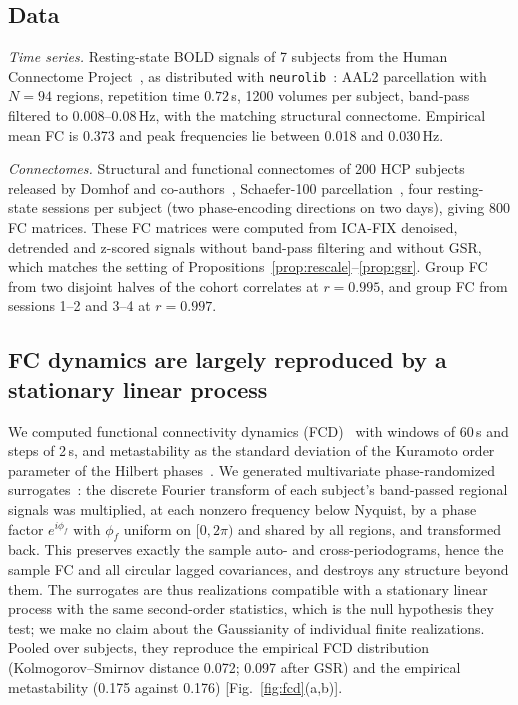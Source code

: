\documentclass[aip,cha,reprint,amsmath,amssymb]{revtex4-2}
\theoremstyle{remark}
\begin{document}
\subsection{Data}

\emph{Time series.} Resting-state BOLD signals of 7 subjects from the Human Connectome Project~\cite{VanEssen2013}, as distributed with \texttt{neurolib}~\cite{Cakan2023}: AAL2 parcellation with $N=94$ regions, repetition time $0.72\,$s, 1200 volumes per subject, band-pass filtered to 0.008--0.08\,Hz, with the matching structural connectome. Empirical mean FC is 0.373 and peak frequencies lie between 0.018 and 0.030\,Hz.

\emph{Connectomes.} Structural and functional connectomes of 200 HCP subjects released by Domhof and co-authors~\cite{DomhofData2021,Domhof2021}, Schaefer-100 parcellation~\cite{Schaefer2018}, four resting-state sessions per subject (two phase-encoding directions on two days), giving 800 FC matrices. These FC matrices were computed from ICA-FIX denoised, detrended and z-scored signals without band-pass filtering and without GSR, which matches the setting of Propositions~\ref{prop:rescale}--\ref{prop:gsr}. Group FC from two disjoint halves of the cohort correlates at $r=0.995$, and group FC from sessions 1--2 and 3--4 at $r=0.997$.

\subsection{FC dynamics are largely reproduced by a stationary linear process}\label{sec:fcd}

We computed functional connectivity dynamics (FCD)~\cite{Hansen2015} with windows of 60\,s and steps of 2\,s, and metastability as the standard deviation of the Kuramoto order parameter of the Hilbert phases~\cite{Shanahan2010}. We generated multivariate phase-randomized surrogates~\cite{Prichard1994}: the discrete Fourier transform of each subject's band-passed regional signals was multiplied, at each nonzero frequency below Nyquist, by a phase factor $e^{i\phi_f}$ with $\phi_f$ uniform on $[0,2\pi)$ and shared by all regions, and transformed back. This preserves exactly the sample auto- and cross-periodograms, hence the sample FC and all circular lagged covariances, and destroys any structure beyond them. The surrogates are thus realizations compatible with a stationary linear process with the same second-order statistics, which is the null hypothesis they test; we make no claim about the Gaussianity of individual finite realizations. Pooled over subjects, they reproduce the empirical FCD distribution (Kolmogorov--Smirnov distance 0.072; 0.097 after GSR) and the empirical metastability (0.175 against 0.176) [Fig.~\ref{fig:fcd}(a,b)].
\end{document}
